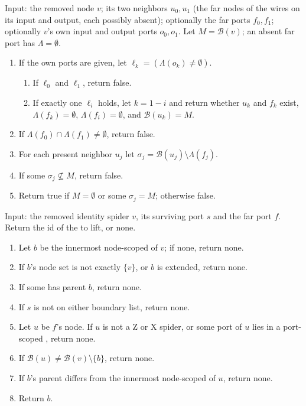 \begin{algorithm}\label{alg:rules-splice-keeps-copies}
Input: the removed node $v$; its two neighbors $u_0,u_1$ (the far nodes of the wires on its input and output, each possibly absent); optionally the far ports $f_0,f_1$; optionally $v$'s own input and output ports $o_0,o_1$. Let $M=\mathcal{B}(v)$; an absent far port has $\Lambda=\emptyset$.
\begin{enumerate}
\item If the own ports are given, let $\ell_k=(\Lambda(o_k)\ne\emptyset)$.
  \begin{enumerate}
  \item If $\ell_0$ and $\ell_1$, return false.
  \item If exactly one $\ell_i$ holds, let $k=1-i$ and return whether $u_k$ and $f_k$ exist, $\Lambda(f_k)=\emptyset$, $\Lambda(f_i)=\emptyset$, and $\mathcal{B}(u_k)=M$.
  \end{enumerate}
\item If $\Lambda(f_0)\cap\Lambda(f_1)\ne\emptyset$, return false.
\item For each present neighbor $u_j$ let $\sigma_j=\mathcal{B}(u_j)\setminus\Lambda(f_j)$.
\item If some $\sigma_j\not\subseteq M$, return false.
\item Return true if $M=\emptyset$ or some $\sigma_j=M$; otherwise false.
\end{enumerate}
\end{algorithm}

\begin{algorithm}\label{alg:rules-liftable}
Input: the removed identity spider $v$, its surviving port $s$ and the far port $f$. Return the id of the \bbox{} to lift, or none.
\begin{enumerate}
\item Let $b$ be the innermost node-scoped \bbox{} of $v$; if none, return none.
\item If $b$'s node set is not exactly $\{v\}$, or $b$ is extended, return none.
\item If some \bbox{} has parent $b$, return none.
\item If $s$ is not on either boundary list, return none.
\item Let $u$ be $f$'s node. If $u$ is not a Z or X spider, or some port of $u$ lies in a port-scoped \bbox{}, return none.
\item If $\mathcal{B}(u)\ne\mathcal{B}(v)\setminus\{b\}$, return none.
\item If $b$'s parent differs from the innermost node-scoped \bbox{} of $u$, return none.
\item Return $b$.
\end{enumerate}
\end{algorithm}

